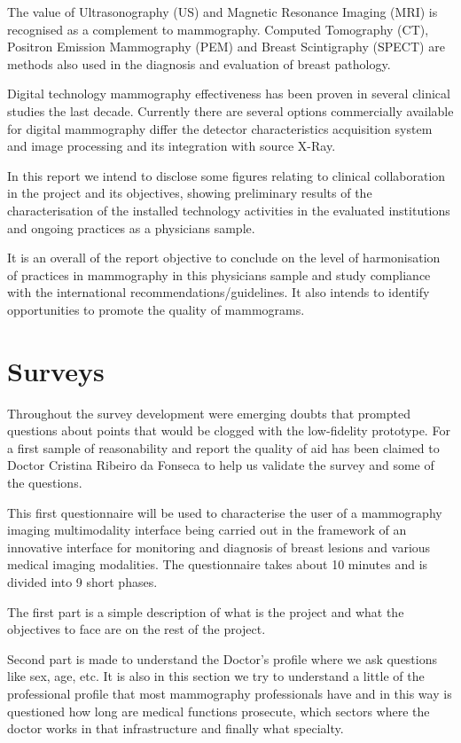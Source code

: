 The value of Ultrasonography (US) and Magnetic Resonance Imaging (MRI) is recognised as a complement to mammography. Computed Tomography (CT), Positron Emission Mammography (PEM) and Breast Scintigraphy (SPECT) are methods also used in the diagnosis and evaluation of breast pathology.

Digital technology mammography effectiveness has been proven in several clinical studies the last decade. Currently there are several options commercially available for digital mammography differ the detector characteristics acquisition system and image processing and its integration with source X-Ray.

In this report we intend to disclose some figures relating to clinical collaboration in the project and its objectives, showing preliminary results of the characterisation of the installed technology activities in the evaluated institutions and ongoing practices as a physicians sample.

It is an overall of the report objective to conclude on the level of harmonisation of practices in mammography in this physicians sample and study compliance with the international recommendations/guidelines. It also intends to identify opportunities to promote the quality of mammograms.

\clearpage

\section{Surveys}

Throughout the survey development were emerging doubts that prompted questions about points that would be clogged with the low-fidelity prototype. For a first sample of reasonability and report the quality of aid has been claimed to Doctor Cristina Ribeiro da Fonseca to help us validate the survey and some of the questions.

This first questionnaire will be used to characterise the user of a mammography imaging multimodality interface being carried out in the framework of an innovative interface for monitoring and diagnosis of breast lesions and various medical imaging modalities. The questionnaire takes about 10 minutes and is divided into 9 short phases.

The first part is a simple description of what is the project and what the objectives to face are on the rest of the project.

Second part is made to understand the Doctor's profile where we ask questions like sex, age, etc. It is also in this section we try to understand a little of the professional profile that most mammography professionals have and in this way is questioned how long are medical functions prosecute, which sectors where the doctor works in that infrastructure and finally what specialty.

